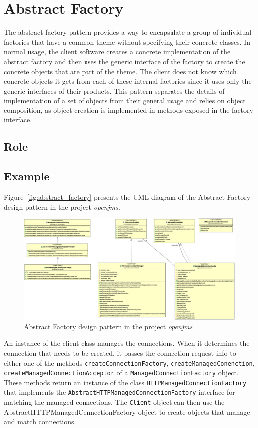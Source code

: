 \section{Abstract Factory}

The abstract factory pattern provides a way to encapsulate a group of individual factories that have a common theme without specifying their concrete classes. In normal usage, the client software creates a concrete implementation of the abstract factory and then uses the generic interface of the factory to create the concrete objects that are part of the theme. The client does not know which concrete objects it gets from each of these internal factories since it uses only the generic interfaces of their products. This pattern separates the details of implementation of a set of objects from their general usage and relies on object composition, as object creation is implemented in methods exposed in the factory interface.

\subsection*{Role}


\subsection*{Example}

Figure~\ref{fig:abstract_factory} presents the UML diagram of the Abstract Factory design pattern in the project \textit{openjms}.

\begin{figure}[htb]
    \centering
    \includegraphics[width=\columnwidth]{images/abstract_factory.png}
    \caption{Abstract Factory design pattern in the project \textit{openjms}}
    \label{}
\end{figure}

An instance of the client class manages the connections. When it determines the connection that needs to be created, it passes the connection request info to either one of the methods \texttt{createConnectionFactory}, \texttt{createManagedConenction}, \texttt{createManagedConnectionAcceptor} of a \texttt{ManagedConnectionFactory} object. These methods return an instance of the class \texttt{HTTPManagedConnectionFactory} that implements the \texttt{AbstractHTTPManagedConnectionFactory} interface for matching the managed connections. The \texttt{Client} object can then use the AbstractHTTPManagedConnectionFactory object to create objects that manage and match connections.

